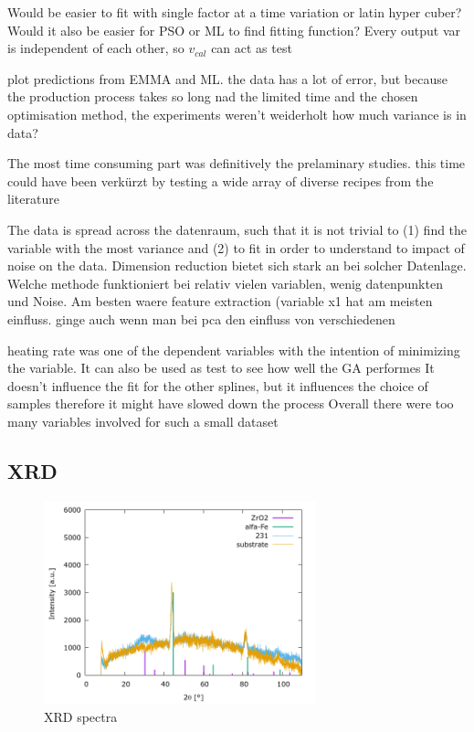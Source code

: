 \documentclass[a4paper]{article}
\newcommand{\picwidth}{0.7\textwidth}
\begin{document}
Would be easier to fit with single factor at a time variation or latin hyper cuber?
Would it also be easier for PSO or ML to find fitting function?
Every output var is independent of each other, so $v_{cal}$ can act as test 

plot predictions from EMMA and ML.
the data has a lot of error, but because the production process takes so long nad the limited time and the chosen optimisation method, the experiments weren't weiderholt
how much variance is in data? 

The most time consuming part was definitively the prelaminary studies.
this time could have been verkürzt by testing a wide array of diverse recipes from the literature

The data is spread across the datenraum, such that it is not trivial to (1) find the variable with the most variance and (2) to fit in order to understand to impact of noise on the data. 
Dimension reduction bietet sich stark an bei solcher Datenlage. 
Welche methode funktioniert bei relativ vielen variablen, wenig datenpunkten und Noise. 
Am besten waere feature extraction (variable x1 hat am meisten einfluss. ginge auch wenn man bei pca den einfluss von verschiedenen 

heating rate was one of the dependent variables with the intention of minimizing the variable. 
It can also be used as test to see how well the GA performes
It doesn't influence the fit for the other splines, but it influences the choice of samples therefore it might have slowed down the process
Overall there were too many variables involved for such a small dataset


\subsection{XRD}

\begin{figure}
	\centering
	\includegraphics[width=\picwidth]{Pics/xrd.png}
	\caption{XRD spectra}
	\label{fig:xrd}
\end{figure}
\end{document}
